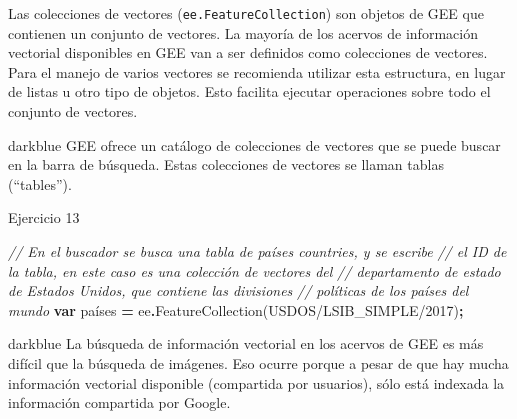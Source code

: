 \documentclass[
  12pt,
  letterpaper,
  twoside]{book}
\newenvironment{Shaded}{\begin{snugshade}}{\end{snugshade}}
\newcommand{\CommentTok}[1]{\textcolor[rgb]{0.56,0.35,0.01}{\textit{#1}}}
\newcommand{\FunctionTok}[1]{\textcolor[rgb]{0.00,0.00,0.00}{#1}}
\newcommand{\KeywordTok}[1]{\textcolor[rgb]{0.13,0.29,0.53}{\textbf{#1}}}
\newcommand{\NormalTok}[1]{#1}
\newcommand{\OperatorTok}[1]{\textcolor[rgb]{0.81,0.36,0.00}{\textbf{#1}}}
\newcommand{\StringTok}[1]{\textcolor[rgb]{0.31,0.60,0.02}{#1}}
\begin{document}
Las colecciones de vectores (\texttt{ee.FeatureCollection}) son objetos de GEE que contienen un conjunto de vectores. La mayoría de los acervos de información vectorial disponibles en GEE van a ser definidos como colecciones de vectores. Para el manejo de varios vectores se recomienda utilizar esta estructura, en lugar de listas u otro tipo de objetos. Esto facilita ejecutar operaciones sobre todo el conjunto de vectores.

\begin{bluebox2}

\begin{awesomeblock}{5pt}{\faLightbulb}{darkblue}
GEE ofrece un catálogo de colecciones de vectores que se puede buscar en la barra de búsqueda. Estas colecciones de vectores se llaman tablas (``tables'').

\end{awesomeblock}

\end{bluebox2}

Ejercicio 13

\begin{Shaded}
\begin{Highlighting}[]
\CommentTok{// En el buscador se busca una tabla de países \textquotesingle{}countries\textquotesingle{}, y se escribe }
\CommentTok{// el ID de la tabla, en este caso es una colección de vectores del }
\CommentTok{// departamento de estado de Estados Unidos, que contiene las divisiones }
\CommentTok{// políticas de los países del mundo  }
\KeywordTok{var}\NormalTok{ países }\OperatorTok{=}\NormalTok{ ee}\OperatorTok{.}\FunctionTok{FeatureCollection}\NormalTok{(}\StringTok{\textquotesingle{}USDOS/LSIB\_SIMPLE/2017\textquotesingle{}}\NormalTok{)}\OperatorTok{;}
\end{Highlighting}
\end{Shaded}

\begin{bluebox2}

\begin{awesomeblock}{5pt}{\faLightbulb}{darkblue}
La búsqueda de información vectorial en los acervos de GEE es más difícil que la búsqueda de imágenes. Eso ocurre porque a pesar de que hay mucha información vectorial disponible (compartida por usuarios), sólo está indexada la información compartida por Google.

\end{awesomeblock}

\end{bluebox2}
\end{document}
